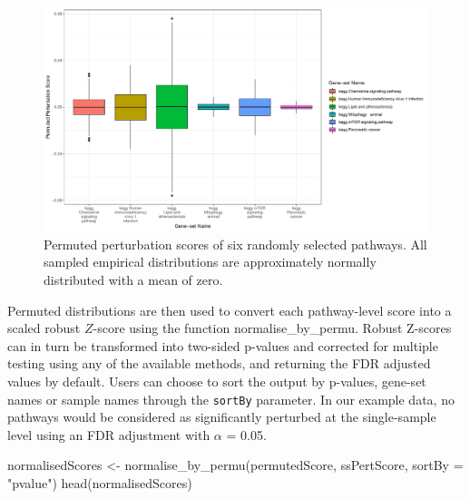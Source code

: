 \documentclass[9pt,a4paper,]{extarticle}
\newenvironment{Shaded}{\begin{snugshade}}{\end{snugshade}}
\newcommand{\AttributeTok}[1]{\textcolor[rgb]{0.77,0.63,0.00}{#1}}
\newcommand{\FunctionTok}[1]{\textcolor[rgb]{0.00,0.00,0.00}{#1}}
\newcommand{\NormalTok}[1]{#1}
\newcommand{\OtherTok}[1]{\textcolor[rgb]{0.56,0.35,0.01}{#1}}
\newcommand{\StringTok}[1]{\textcolor[rgb]{0.31,0.60,0.02}{#1}}
\begin{document}
\begin{figure}

{\centering \includegraphics[width=1\linewidth]{sSNAPPY_paper_files/figure-latex/Figure1-1} 

}

\caption{Permuted perturbation scores of six randomly selected pathways. All sampled empirical distributions are approximately normally distributed with a mean of zero.}\label{fig:Figure1}
\end{figure}

Permuted distributions are then used to convert each pathway-level score into a scaled robust \(Z\)-score using the function normalise\_by\_permu.
Robust Z-scores can in turn be transformed into two-sided p-values and corrected for multiple testing using any of the available methods, and returning the FDR adjusted values by default.
Users can choose to sort the output by p-values, gene-set names or sample names through the \texttt{sortBy} parameter.
In our example data, no pathways would be considered as significantly perturbed at the single-sample level using an FDR adjustment with \(\alpha\) = 0.05.

\begin{Shaded}
\begin{Highlighting}[]
\NormalTok{normalisedScores }\OtherTok{\textless{}{-}} \FunctionTok{normalise\_by\_permu}\NormalTok{(permutedScore, ssPertScore, }
                                       \AttributeTok{sortBy =} \StringTok{"pvalue"}\NormalTok{)}
\FunctionTok{head}\NormalTok{(normalisedScores)}
\end{Highlighting}
\end{Shaded}
\end{document}
